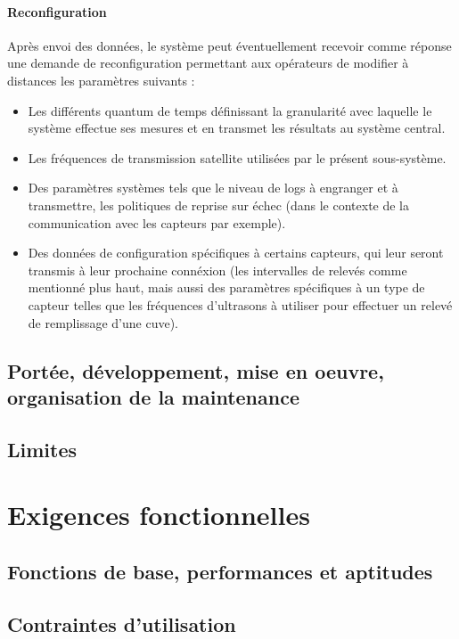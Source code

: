 \paragraph{Reconfiguration} Après envoi des données, le système peut éventuellement recevoir comme réponse une demande de reconfiguration permettant aux opérateurs de modifier à distances les paramètres suivants :

\begin{itemize}
\item Les différents quantum de temps définissant la granularité avec laquelle le système effectue ses mesures et en transmet les résultats au système central.
\item Les fréquences de transmission satellite utilisées par le présent sous-système.
\item Des paramètres systèmes tels que le niveau de logs à engranger et à transmettre, les politiques de reprise sur échec (dans le contexte de la communication avec les capteurs par exemple).
\item Des données de configuration spécifiques à certains capteurs, qui leur seront transmis à leur prochaine connéxion (les intervalles de relevés comme mentionné plus haut, mais aussi des paramètres spécifiques à un type de capteur telles que les fréquences d'ultrasons à utiliser pour effectuer un relevé de remplissage d'une cuve).
\end{itemize}

\subsection{Portée, développement, mise en oeuvre, organisation de la maintenance}



\subsection{Limites}

\section{Exigences fonctionnelles}
\subsection{Fonctions de base, performances et aptitudes}
\subsection{Contraintes d'utilisation}
